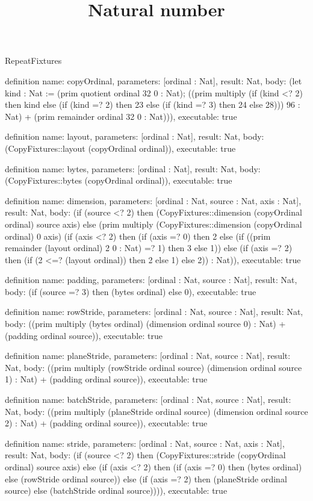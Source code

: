\begin{lexlean}{RepeatFixtures}
\title{Natural number}
\begin{semanticmodule}
definition{
  name: copyOrdinal,
  parameters: [ordinal : Nat],
  result: Nat,
  body: (let kind : Nat := (prim quotient ordinal 32 0 : Nat); ((prim multiply (if (kind <? 2) then kind else (if (kind =? 2) then 23 else (if (kind =? 3) then 24 else 28))) 96 : Nat) + (prim remainder ordinal 32 0 : Nat))),
  executable: true
}

definition{
  name: layout,
  parameters: [ordinal : Nat],
  result: Nat,
  body: (CopyFixtures::layout (copyOrdinal ordinal)),
  executable: true
}

definition{
  name: bytes,
  parameters: [ordinal : Nat],
  result: Nat,
  body: (CopyFixtures::bytes (copyOrdinal ordinal)),
  executable: true
}

definition{
  name: dimension,
  parameters: [ordinal : Nat, source : Nat, axis : Nat],
  result: Nat,
  body: (if (source <? 2) then (CopyFixtures::dimension (copyOrdinal ordinal) source axis) else (prim multiply (CopyFixtures::dimension (copyOrdinal ordinal) 0 axis) (if (axis <? 2) then (if (axis =? 0) then 2 else (if ((prim remainder (layout ordinal) 2 0 : Nat) =? 1) then 3 else 1)) else (if (axis =? 2) then (if (2 <=? (layout ordinal)) then 2 else 1) else 2)) : Nat)),
  executable: true
}

definition{
  name: padding,
  parameters: [ordinal : Nat, source : Nat],
  result: Nat,
  body: (if (source =? 3) then (bytes ordinal) else 0),
  executable: true
}

definition{
  name: rowStride,
  parameters: [ordinal : Nat, source : Nat],
  result: Nat,
  body: ((prim multiply (bytes ordinal) (dimension ordinal source 0) : Nat) + (padding ordinal source)),
  executable: true
}

definition{
  name: planeStride,
  parameters: [ordinal : Nat, source : Nat],
  result: Nat,
  body: ((prim multiply (rowStride ordinal source) (dimension ordinal source 1) : Nat) + (padding ordinal source)),
  executable: true
}

definition{
  name: batchStride,
  parameters: [ordinal : Nat, source : Nat],
  result: Nat,
  body: ((prim multiply (planeStride ordinal source) (dimension ordinal source 2) : Nat) + (padding ordinal source)),
  executable: true
}

definition{
  name: stride,
  parameters: [ordinal : Nat, source : Nat, axis : Nat],
  result: Nat,
  body: (if (source <? 2) then (CopyFixtures::stride (copyOrdinal ordinal) source axis) else (if (axis <? 2) then (if (axis =? 0) then (bytes ordinal) else (rowStride ordinal source)) else (if (axis =? 2) then (planeStride ordinal source) else (batchStride ordinal source)))),
  executable: true
}


\end{semanticmodule}
\end{lexlean}
